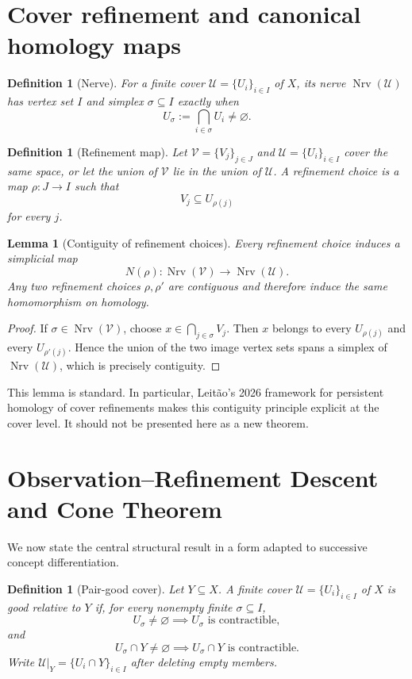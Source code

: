 \documentclass[11pt]{article}
\newtheorem{lemma}[theorem]{Lemma}
\newtheorem{definition}[theorem]{Definition}
\newcommand{\Nrv}{\operatorname{Nrv}}
\begin{document}
\section{Cover refinement and canonical homology maps}

\begin{definition}[Nerve]
For a finite cover $\mathcal U=\{U_i\}_{i\in I}$ of $X$, its nerve $\Nrv(\mathcal U)$ has vertex set $I$ and simplex $\sigma\subseteq I$ exactly when
\[
U_\sigma:=\bigcap_{i\in\sigma}U_i\neq\varnothing.
\]
\end{definition}

\begin{definition}[Refinement map]
Let $\mathcal V=\{V_j\}_{j\in J}$ and $\mathcal U=\{U_i\}_{i\in I}$ cover the same space, or let the union of $\mathcal V$ lie in the union of $\mathcal U$.  A refinement choice is a map $\rho:J\to I$ such that
\[
V_j\subseteq U_{\rho(j)}
\]
for every $j$.
\end{definition}

\begin{lemma}[Contiguity of refinement choices]\label{lem:contiguity}
Every refinement choice induces a simplicial map
\[
N(\rho):\Nrv(\mathcal V)\to\Nrv(\mathcal U).
\]
Any two refinement choices $\rho,\rho'$ are contiguous and therefore induce the same homomorphism on homology.
\end{lemma}
\begin{proof}
If $\sigma\in\Nrv(\mathcal V)$, choose $x\in\bigcap_{j\in\sigma}V_j$.  Then $x$ belongs to every $U_{\rho(j)}$ and every $U_{\rho'(j)}$.  Hence the union of the two image vertex sets spans a simplex of $\Nrv(\mathcal U)$, which is precisely contiguity.
\end{proof}

This lemma is standard.  In particular, Leit\~ao's 2026 framework for persistent homology of cover refinements makes this contiguity principle explicit at the cover level.  It should not be presented here as a new theorem.

\section{Observation--Refinement Descent and Cone Theorem}

We now state the central structural result in a form adapted to successive concept differentiation.

\begin{definition}[Pair-good cover]
Let $Y\subseteq X$.  A finite cover $\mathcal U=\{U_i\}_{i\in I}$ of $X$ is \emph{good relative to $Y$} if, for every nonempty finite $\sigma\subseteq I$,
\[
U_\sigma\neq\varnothing\implies U_\sigma\text{ is contractible},
\]
and
\[
U_\sigma\cap Y\neq\varnothing\implies U_\sigma\cap Y\text{ is contractible}.
\]
Write $\mathcal U|_Y=\{U_i\cap Y\}_{i\in I}$ after deleting empty members.
\end{definition}
\end{document}
